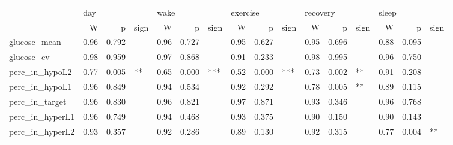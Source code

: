 \begin{tabular}{lrrlrrlrrlrrlrrl}
\toprule
{} & \multicolumn{3}{l}{day} & \multicolumn{3}{l}{wake} & \multicolumn{3}{l}{exercise} & \multicolumn{3}{l}{recovery} & \multicolumn{3}{l}{sleep} \\
{} &     W &      p & sign &     W &      p & sign &        W &      p & sign &        W &      p & sign &     W &      p & sign \\
\midrule
glucose_mean    &  0.96 &  0.792 &      &  0.96 &  0.727 &      &     0.95 &  0.627 &      &     0.95 &  0.696 &      &  0.88 &  0.095 &      \\
glucose_cv      &  0.98 &  0.959 &      &  0.97 &  0.868 &      &     0.91 &  0.233 &      &     0.98 &  0.995 &      &  0.96 &  0.750 &      \\
perc_in_hypoL2  &  0.77 &  0.005 &   ** &  0.65 &  0.000 &  *** &     0.52 &  0.000 &  *** &     0.73 &  0.002 &   ** &  0.91 &  0.208 &      \\
perc_in_hypoL1  &  0.96 &  0.849 &      &  0.94 &  0.534 &      &     0.92 &  0.292 &      &     0.78 &  0.005 &   ** &  0.89 &  0.115 &      \\
perc_in_target  &  0.96 &  0.830 &      &  0.96 &  0.821 &      &     0.97 &  0.871 &      &     0.93 &  0.346 &      &  0.96 &  0.768 &      \\
perc_in_hyperL1 &  0.96 &  0.749 &      &  0.94 &  0.468 &      &     0.93 &  0.375 &      &     0.90 &  0.150 &      &  0.90 &  0.143 &      \\
perc_in_hyperL2 &  0.93 &  0.357 &      &  0.92 &  0.286 &      &     0.89 &  0.130 &      &     0.92 &  0.315 &      &  0.77 &  0.004 &   ** \\
\bottomrule
\end{tabular}
